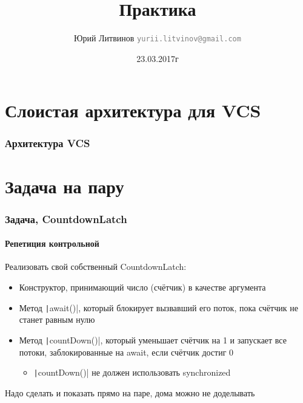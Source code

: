 \documentclass[xetex,mathserif,serif]{beamer}
\title{Практика}
\author[Юрий Литвинов]{Юрий Литвинов \newline \textcolor{gray}{\small\texttt{yurii.litvinov@gmail.com}}}
\date{23.03.2017г}
\begin{document}
	
	\frame{\titlepage}
	
	\section{Слоистая архитектура для VCS}

	\begin{frame}
		\frametitle{Архитектура VCS}
	\end{frame}

	\section{Задача на пару}

	\begin{frame}
		\frametitle{Задача, CountdownLatch}
		\framesubtitle{Репетиция контрольной}
		Реализовать свой собственный CountdownLatch:
		\begin{itemize}
			\item Конструктор, принимающий число (счётчик) в качестве аргумента
			\item Метод \texttt|await()|, который блокирует вызвавший его поток, пока счётчик не станет равным нулю
			\item Метод \texttt|countDown()|, который уменьшает счётчик на 1 и запускает все потоки, заблокированные на await, если счётчик достиг 0
			\begin{itemize}
				\item \texttt|countDown()| не должен использовать synchronized
			\end{itemize}
		\end{itemize}

		Надо сделать и показать прямо на паре, дома можно не доделывать
	\end{frame}
\end{document}
